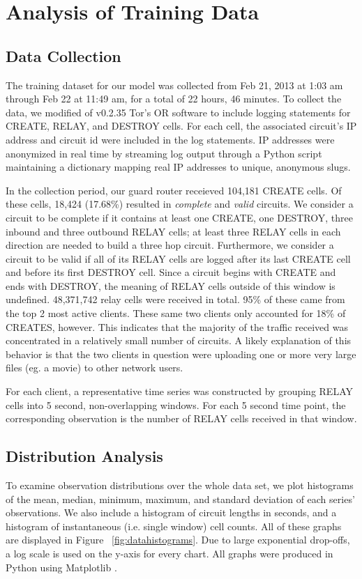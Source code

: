 \chapter{Analysis of Training Data}
\section{Data Collection}
The training dataset for our model was collected from Feb 21, 2013 at 1:03 am through Feb 22 at 11:49 am, for a total of 22 hours, 46 minutes. To collect the data, we modified of v0.2.35 Tor's OR software to include logging statements for CREATE, RELAY, and DESTROY cells. For each cell, the associated circuit's IP address and circuit id were included in the log statements. IP addresses were anonymized in real time by streaming log output through a Python script maintaining a dictionary mapping real IP addresses to unique, anonymous slugs.

In the collection period, our guard router receieved 104,181 CREATE cells. Of these cells, 18,424 (17.68\%) resulted in \textit{complete} and \textit{valid}  circuits. We consider a circuit to be complete if it contains at least one CREATE, one DESTROY, three inbound and three outbound RELAY cells; at least three RELAY cells in each direction are needed to build a three hop circuit. Furthermore, we consider a circuit to be valid if all of its RELAY cells are logged after its last CREATE cell and before its first DESTROY cell. Since a circuit begins with CREATE and ends with DESTROY, the meaning of RELAY cells outside of this window is undefined. 48,371,742 relay cells were received in total. 95\% of these came from the top 2 most active clients. These same two clients only accounted for 18\% of CREATES, however. This indicates that the majority of the traffic received was concentrated in a relatively small number of circuits. A likely explanation of this behavior is that the two clients in question were uploading one or more very large files (eg. a movie) to other network users.

For each client, a representative time series was constructed by grouping RELAY cells into 5 second, non-overlapping windows. For each 5 second time point, the corresponding observation is the number of RELAY cells received in that window.

\section{Distribution Analysis}
 To examine observation distributions over the whole data set, we plot histograms of the mean, median, minimum, maximum, and standard deviation of each series' observations. We also include a histogram of circuit lengths in seconds, and a histogram of instantaneous (i.e. single window) cell counts. All of these graphs are displayed in Figure ~\ref{fig:datahistograms}. Due to large exponential drop-offs, a log scale is used on the y-axis for every chart. All graphs were produced in Python using Matplotlib \citep{hunter2007}.

